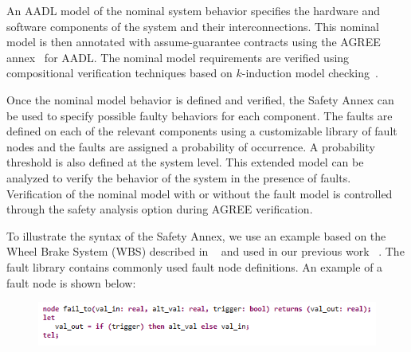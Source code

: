 An AADL model of the nominal system behavior specifies the hardware and software components of the system and their interconnections. This nominal model is then annotated with assume-guarantee contracts using the AGREE annex~\cite{NFM2012:CoGaMiWhLaLu} for AADL. The nominal model requirements are verified using compositional verification techniques based on $k$-induction model checking~\cite{2017arXiv171201222G}.

Once the nominal model behavior is defined and verified, the Safety Annex can be used to specify possible faulty behaviors for each component. The faults are defined on each of the relevant components using a customizable library of fault nodes and the faults are assigned a probability of occurrence. A probability threshold is also defined at the system level. This extended model can be analyzed to verify the behavior of the system in the presence of faults. Verification of the nominal model with or without the fault model is controlled through the safety analysis option during AGREE verification.

To illustrate the syntax of the Safety Annex, we use an example based on the Wheel Brake System (WBS) described in ~\cite{AIR6110} and used in our previous work ~\cite{Stewart17:IMBSA}.
The fault library contains commonly used fault node definitions. An example of a fault node is shown below:
\begin{figure}[h!]
	\vspace{-0.19in}
	\begin{center}
		\includegraphics[trim=0 9 0 5,clip,width=1.0\textwidth]{images/faultNode.png}
	\end{center}
	\vspace{-0.4in}
\end{figure}

